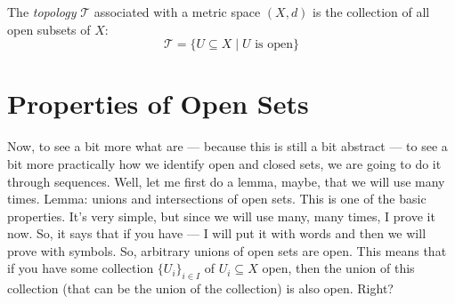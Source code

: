 \begin{math-stroke}
\begin{definition}[Topology]\label{def:topology-v2}
The \emph{topology} $\mathcal{T}$ associated with a metric space $(X, d)$ is the collection of all open subsets of $X$:
\[ \mathcal{T} = \{ U \subseteq X \mid U \text{ is open} \} \]
\end{definition}
\end{math-stroke}

\section{Properties of Open Sets}

\begin{spoken-clean}[00:11:35 - 00:13:43]
Now, to see a bit more what are --- because this is still a bit abstract --- to see a bit more practically how we identify open and closed sets, we are going to do it through sequences. Well, let me first do a lemma, maybe, that we will use many times. Lemma: unions and intersections of open sets. This is one of the basic properties. It's very simple, but since we will use many, many times, I prove it now. So, it says that if you have --- I will put it with words and then we will prove with symbols. So, arbitrary unions of open sets are open. This means that if you have some collection $\{U_i\}_{i \in I}$ of $U_i \subseteq X$ open, then the union of this collection (that can be the union of the collection) is also open. Right?
\end{spoken-clean}

\begin{nice-box}
\setcounter{theorem}{42}
\end{nice-box}

